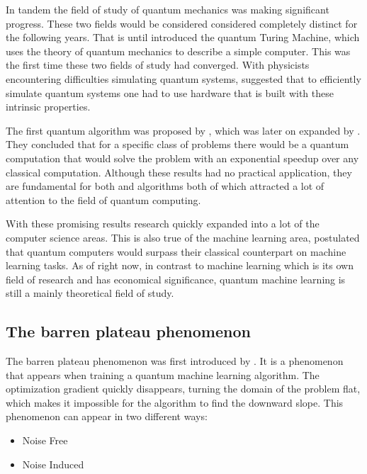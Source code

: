 In tandem the field of study of quantum mechanics was making significant progress. These two fields would be considered considered completely distinct for the following years. That is until \cite{Benioff1980TheCA} introduced the quantum Turing Machine, which uses the theory of quantum mechanics to describe a simple computer. This was the first time these two fields of study had converged. With physicists encountering difficulties simulating quantum systems, \cite{Feynman1982-FEYSPW} suggested that to efficiently simulate quantum systems one had to use hardware that is built with these intrinsic properties.

The first quantum algorithm was proposed by \cite{Deutsch1985QuantumTT}, which was later on expanded by \cite{Deutsch1992RapidSO}. They concluded that for a specific class of problems there would be a quantum computation that would solve the problem with an exponential speedup over any classical computation. Although these results had no practical application, they are fundamental for both \cite{365700} and \cite{grover1996fast} algorithms both of which attracted a lot of attention to the field of quantum computing.

With these promising results research quickly expanded into a lot of the computer science areas. This is also true of the machine learning area, \cite{Biamonte_2017} postulated that quantum computers would surpass their classical counterpart on machine learning tasks. As of right now, in contrast to machine learning which is its own field of research and has economical significance, quantum machine learning is still a mainly theoretical field of study.

\subsection{The barren plateau phenomenon}

The barren plateau phenomenon was first introduced by \cite{McClean_2018}. It is a phenomenon that appears when training a quantum machine learning algorithm. The optimization gradient quickly disappears, turning the domain of the problem flat, which makes it impossible for the algorithm to find the downward slope.
This phenomenon can appear in two different ways:

\begin{itemize}
    \item Noise Free
    \item Noise Induced
\end{itemize}

